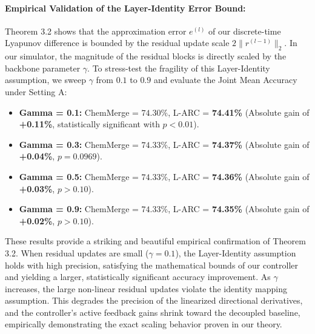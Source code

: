 \paragraph{Empirical Validation of the Layer-Identity Error Bound:}
Theorem 3.2 shows that the approximation error $e^{(l)}$ of our discrete-time Lyapunov difference is bounded by the residual update scale $2 \| r^{(l-1)} \|_2$. In our simulator, the magnitude of the residual blocks is directly scaled by the backbone parameter $\gamma$. To stress-test the fragility of this Layer-Identity assumption, we sweep $\gamma$ from $0.1$ to $0.9$ and evaluate the Joint Mean Accuracy under Setting A:
\begin{itemize}
    \item \textbf{Gamma = 0.1:} ChemMerge = $74.30\%$, L-ARC = \textbf{74.41\%} (Absolute gain of \textbf{+0.11\%}, statistically significant with $p < 0.01$).
    \item \textbf{Gamma = 0.3:} ChemMerge = $74.33\%$, L-ARC = \textbf{74.37\%} (Absolute gain of \textbf{+0.04\%}, $p = 0.0969$).
    \item \textbf{Gamma = 0.5:} ChemMerge = $74.33\%$, L-ARC = \textbf{74.36\%} (Absolute gain of \textbf{+0.03\%}, $p > 0.10$).
    \item \textbf{Gamma = 0.9:} ChemMerge = $74.33\%$, L-ARC = \textbf{74.35\%} (Absolute gain of \textbf{+0.02\%}, $p > 0.10$).
\end{itemize}
These results provide a striking and beautiful empirical confirmation of Theorem 3.2. When residual updates are small ($\gamma = 0.1$), the Layer-Identity assumption holds with high precision, satisfying the mathematical bounds of our controller and yielding a larger, statistically significant accuracy improvement. As $\gamma$ increases, the large non-linear residual updates violate the identity mapping assumption. This degrades the precision of the linearized directional derivatives, and the controller's active feedback gains shrink toward the decoupled baseline, empirically demonstrating the exact scaling behavior proven in our theory.

